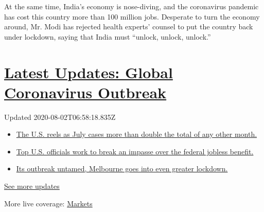 At the same time, India's economy is nose-diving, and the coronavirus
pandemic has cost this country more than 100 million jobs. Desperate to
turn the economy around, Mr. Modi has rejected health experts' counsel
to put the country back under lockdown, saying that India must ``unlock,
unlock, unlock.''

\hypertarget{latest-updates-global-coronavirus-outbreak}{%
\section{\texorpdfstring{\href{https://www.nytimes.com/2020/08/01/world/coronavirus-covid-19.html?action=click\&pgtype=Article\&state=default\&region=MAIN_CONTENT_1\&context=storylines_live_updates}{Latest
Updates: Global Coronavirus
Outbreak}}{Latest Updates: Global Coronavirus Outbreak}}\label{latest-updates-global-coronavirus-outbreak}}

Updated 2020-08-02T06:58:18.835Z

\begin{itemize}
\tightlist
\item
  \href{https://www.nytimes.com/2020/08/01/world/coronavirus-covid-19.html?action=click\&pgtype=Article\&state=default\&region=MAIN_CONTENT_1\&context=storylines_live_updates\#link-34047410}{The
  U.S. reels as July cases more than double the total of any other
  month.}
\item
  \href{https://www.nytimes.com/2020/08/01/world/coronavirus-covid-19.html?action=click\&pgtype=Article\&state=default\&region=MAIN_CONTENT_1\&context=storylines_live_updates\#link-780ec966}{Top
  U.S. officials work to break an impasse over the federal jobless
  benefit.}
\item
  \href{https://www.nytimes.com/2020/08/01/world/coronavirus-covid-19.html?action=click\&pgtype=Article\&state=default\&region=MAIN_CONTENT_1\&context=storylines_live_updates\#link-2bc8948}{Its
  outbreak untamed, Melbourne goes into even greater lockdown.}
\end{itemize}

\href{https://www.nytimes.com/2020/08/01/world/coronavirus-covid-19.html?action=click\&pgtype=Article\&state=default\&region=MAIN_CONTENT_1\&context=storylines_live_updates}{See
more updates}

More live coverage:
\href{https://www.nytimes.com/live/2020/07/31/business/stock-market-today-coronavirus?action=click\&pgtype=Article\&state=default\&region=MAIN_CONTENT_1\&context=storylines_live_updates}{Markets}

